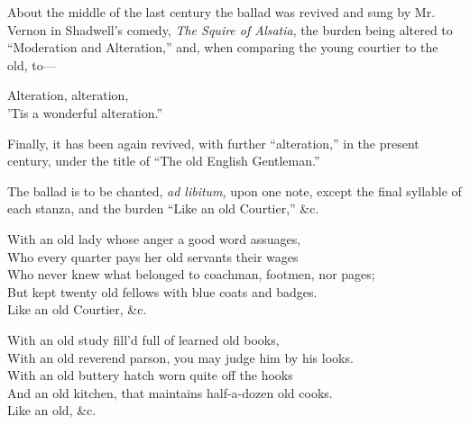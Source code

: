 About the middle of the last century the ballad was revived and sung by
Mr. Vernon in Shadwell’s comedy, \textit{The Squire of Alsatia}, the burden being altered
to “Moderation and Alteration,” and, when comparing the young courtier to
the old, to—
\settowidth{\versewidth}{’Tis a wonderful alteration.”}
\begin{scverse}
Alteration, alteration,\\
’Tis a wonderful alteration.”
\end{scverse}

Finally, it has been again revived, with further “alteration,” in the present
century, under the title of “The old English Gentleman.”

The ballad is to be chanted, \textit{ad libitum}, upon one note, except the final syllable
of each stanza, and the burden “Like an old Courtier,” \&c.



\settowidth{\versewidth}{Who every quarter pays her old servants their}
\begin{dcverse}With an old lady whose anger a good word assuages,\\
Who every quarter pays her old servants their wages\\
Who never knew what belonged to coachman, footmen, nor pages;\\
But kept twenty old fellows with blue coats and badges.\\
Like an old Courtier, \&c.

With an old study fill’d full of learned old books,\\
With an old reverend parson, you may judge him by his looks.\\
With an old buttery hatch worn quite off the hooks\\
And an old kitchen, that maintains half-a-dozen old cooks.\\
Like an old, \&c.

\end{dcverse}
\pagebreak

